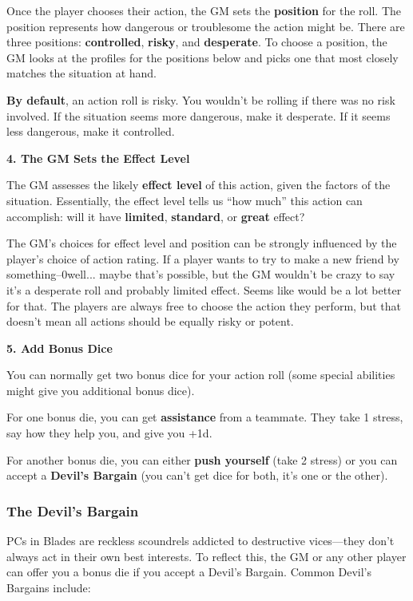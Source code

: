 Once the player chooses their action, the GM sets the \textbf{position} for the roll. The position represents how dangerous or troublesome the action might be. There are three positions: \textbf{controlled}, \textbf{risky}, and \textbf{desperate}. To choose a position, the GM looks at the profiles for the positions below and picks one that most closely matches the situation at hand.

\textbf{By default}, an action roll is risky. You wouldn’t be rolling if there was no risk involved. If the situation seems more dangerous, make it desperate. If it seems less dangerous, make it controlled.

\textbf{4. The GM Sets the Effect Level}

The GM assesses the likely \textbf{effect level} of this action, given the factors of the situation. Essentially, the effect level tells us ``how much'' this action can accomplish: will it have \textbf{limited}, \textbf{standard}, or \textbf{great} effect?

\begin{qb}The GM’s choices for effect level and position can be strongly influenced by the player’s choice of action rating. If a player wants to try to make a new friend by  something--0well... maybe that’s possible, but the GM wouldn’t be crazy to say it’s a desperate roll and probably limited effect. Seems like  would be a lot better for that. The players are always free to choose the action they perform, but that doesn’t mean all actions should be equally risky or potent.\end{qb}

\textbf{5. Add Bonus Dice}

You can normally get two bonus dice for your action roll (some special abilities might give you additional bonus dice).

For one bonus die, you can get \textbf{assistance} from a teammate. They take 1 stress, say how they help you, and give you +1d.

For another bonus die, you can either \textbf{push yourself} (take 2 stress) or you can accept a \textbf{Devil’s Bargain} (you can’t get dice for both, it’s one or the other).

\subsubsection{The Devil’s Bargain}

PCs in Blades are reckless scoundrels addicted to destructive vices—they don’t always act in their own best interests. To reflect this, the GM or any other player can offer you a bonus die if you accept a Devil’s Bargain. Common Devil’s Bargains include:

